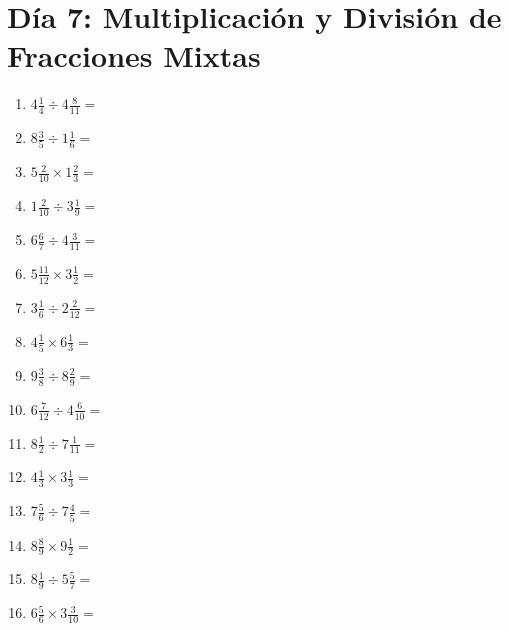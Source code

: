 \documentclass[12pt]{article}
\begin{document}
\section*{Día 7: Multiplicación y División de Fracciones Mixtas}
\begin{enumerate}
\item \large $ 4 \frac{1}{4} \div 4 \frac{8}{11} = $ \vspace{1.6cm}
\item \large $ 8 \frac{3}{5} \div 1 \frac{1}{6} = $ \vspace{1.6cm}
\item \large $ 5 \frac{2}{10} \times 1 \frac{2}{3} = $ \vspace{1.6cm}
\item \large $ 1 \frac{2}{10} \div 3 \frac{1}{9} = $ \vspace{1.6cm}
\item \large $ 6 \frac{6}{7} \div 4 \frac{3}{11} = $ \vspace{1.6cm}
\item \large $ 5 \frac{11}{12} \times 3 \frac{1}{2} = $ \vspace{1.6cm}
\item \large $ 3 \frac{1}{6} \div 2 \frac{2}{12} = $ \vspace{1.6cm}
\item \large $ 4 \frac{1}{5} \times 6 \frac{1}{3} = $ \vspace{1.6cm}
\item \large $ 9 \frac{3}{8} \div 8 \frac{2}{9} = $ \vspace{1.6cm}
\item \large $ 6 \frac{7}{12} \div 4 \frac{6}{10} = $ \vspace{1.6cm}
\newpage
\item \large $ 8 \frac{1}{2} \div 7 \frac{1}{11} = $ \vspace{1.6cm}
\item \large $ 4 \frac{1}{3} \times 3 \frac{1}{3} = $ \vspace{1.6cm}
\item \large $ 7 \frac{5}{6} \div 7 \frac{4}{5} = $ \vspace{1.6cm}
\item \large $ 8 \frac{8}{9} \times 9 \frac{1}{2} = $ \vspace{1.6cm}
\item \large $ 8 \frac{1}{9} \div 5 \frac{5}{7} = $ \vspace{1.6cm}
\item \large $ 6 \frac{5}{6} \times 3 \frac{3}{10} = $ \vspace{1.6cm}

\end{enumerate}
\end{document}

